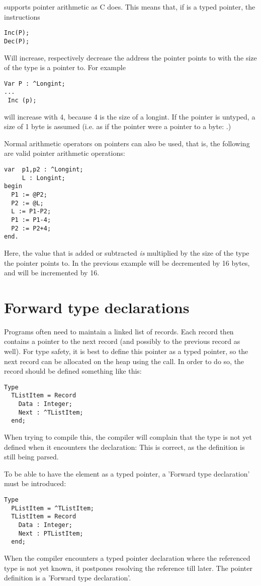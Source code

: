 \fpc supports pointer arithmetic as C does. This means that, if  is a
typed pointer, the instructions
\begin{verbatim}
Inc(P);
Dec(P);
\end{verbatim}
Will increase, respectively decrease the address the pointer points to
with the size of the type  is a pointer to. For example
\begin{verbatim}
Var P : ^Longint;
...
 Inc (p);
\end{verbatim}
will increase  with 4, because 4 is the size of a longint. If the
pointer is untyped, a size of 1 byte is assumed (i.e. as if the pointer were
a pointer to a byte: .)

Normal arithmetic operators  on pointers can also be used, 
that is, the following are valid pointer arithmetic operations:
\begin{verbatim}
var  p1,p2 : ^Longint;
     L : Longint;
begin
  P1 := @P2;
  P2 := @L;
  L := P1-P2;
  P1 := P1-4;
  P2 := P2+4;
end.
\end{verbatim}
Here, the value that is added or subtracted {\em is } multiplied by the
size of the type the pointer points to. In the previous
example  will be decremented by 16 bytes, and 
 will be incremented by 16.

\section{Forward type declarations}
Programs often need to maintain a linked list of records. Each record then
contains a pointer to the next record (and possibly to the previous record
as well). For type safety, it is best to define this pointer as a typed
pointer, so the next record can be allocated on the heap using the 
call. In order to do so, the record should be defined something like this:
\begin{verbatim}
Type
  TListItem = Record
    Data : Integer;
    Next : ^TListItem;
  end;
\end{verbatim}  
When trying to compile this, the compiler will complain that the
 type is not yet defined when it encounters the 
declaration: This is correct, as the definition is still being parsed.

To be able to have the  element as a typed pointer, a 'Forward
type declaration' must be introduced:
\begin{verbatim}
Type
  PListItem = ^TListItem;
  TListItem = Record
    Data : Integer;
    Next : PTListItem;
  end;
\end{verbatim}  
When the compiler encounters a typed pointer declaration where the
referenced type is not yet known, it postpones resolving the reference till
later. The pointer definition is a 'Forward type declaration'. 

